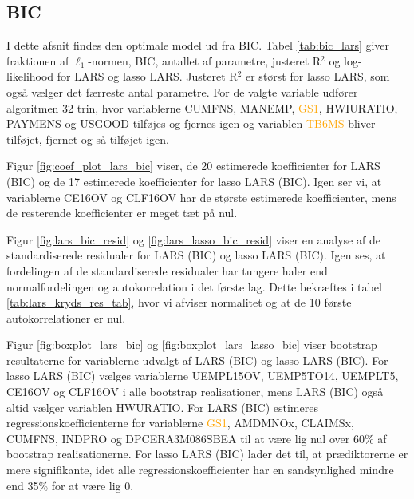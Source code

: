 \subsection{BIC}
I dette afsnit findes den optimale model ud fra BIC.
Tabel \ref{tab:bic_lars} giver fraktionen af \(\ell_1\)-normen, BIC, antallet af parametre, justeret R$^2$ og log-likelihood for LARS og lasso LARS.
Justeret R$^2$ er størst for lasso LARS, som også vælger det færreste antal parametre. 
 For de valgte variable udfører algoritmen 32 trin, hvor variablerne \textcolor{chartreuse4}{CUMFNS}, \textcolor{blue3}{MANEMP}, \textcolor{orange}{GS1}, \textcolor{blue3}{HWIURATIO}, \textcolor{blue3}{PAYMENS} og \textcolor{blue3}{USGOOD} tilføjes og fjernes igen og variablen \textcolor{orange}{TB6MS} bliver tilføjet, fjernet og så tilføjet igen. 




Figur \ref{fig:coef_plot_lars_bic} viser, de 20 estimerede koefficienter for LARS (BIC) og de 17 estimerede koefficienter for lasso LARS (BIC).  
Igen ser vi, at  variablerne \textcolor{blue3}{CE16OV} og \textcolor{blue3}{CLF16OV} har de største estimerede koefficienter, mens de resterende koefficienter er meget tæt på nul. 



Figur \ref{fig:lars_bic_resid} og \ref{fig:lars_lasso_bic_resid} viser en analyse af de standardiserede residualer for LARS (BIC) og lasso LARS (BIC). 
Igen ses, at fordelingen af de standardiserede residualer har tungere haler end normalfordelingen og autokorrelation i det første lag. 
Dette bekræftes i tabel \ref{tab:lars_kryds_res_tab}, hvor vi afviser normalitet og at de 10 første autokorrelationer er nul.

Figur \ref{fig:boxplot_lars_bic} og \ref{fig:boxplot_lars_lasso_bic} viser bootstrap resultaterne for variablerne udvalgt af LARS (BIC) og lasso LARS (BIC). 
For lasso LARS (BIC) vælges variablerne \textcolor{blue3}{UEMPL15OV}, \textcolor{blue3}{UEMP5TO14}, \textcolor{blue3}{UEMPLT5}, \textcolor{blue3}{CE16OV} og \textcolor{blue3}{CLF16OV} i alle bootstrap realisationer, mens LARS (BIC) også altid vælger variablen \textcolor{blue3}{HWURATIO}.
For LARS (BIC) estimeres regressionskoefficienterne for variablerne \textcolor{orange}{GS1}, \textcolor{red3}{AMDMNOx}, \textcolor{blue3}{CLAIMSx}, \textcolor{chartreuse4}{CUMFNS}, \textcolor{chartreuse4}{INDPRO} og \textcolor{red3}{DPCERA3M086SBEA} til at være lig nul over 60\% af bootstrap realisationerne.
For lasso LARS (BIC) lader det til, at prædiktorerne er mere signifikante, idet alle regressionskoefficienter har en sandsynlighed mindre end 35\% for at være lig 0. 

